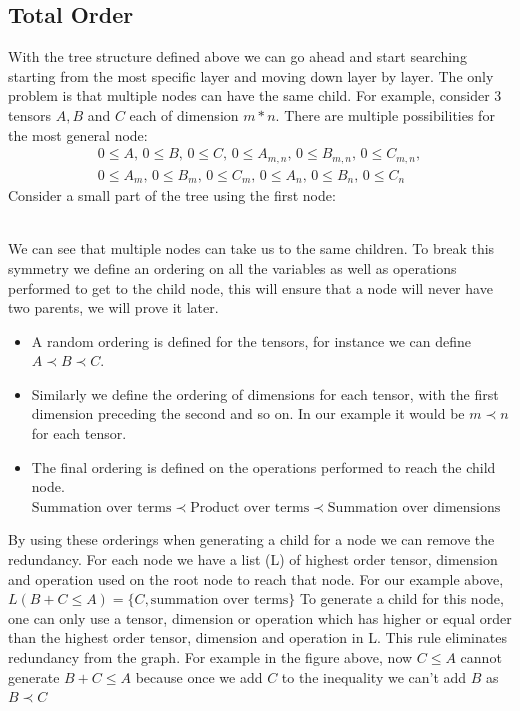 \documentclass{article}
\begin{document}
\subsection{Total Order}
With the tree structure defined above we can go ahead and start searching starting from the most specific layer and moving down layer by layer. The only problem is that multiple nodes can have the same child. 
For example, consider 3 tensors $A, B$ and $C$ each of dimension $m*n$. There are multiple possibilities for the most general node:
\begin{multline*}
    0 \le A,\, 0 \le B,\, 0\le C,\, 
    0 \le A_{m,n},\, 0 \le B_{m,n},\, 0\le C_{m,n},\\
    0 \le A_m,\, 0 \le B_m,\, 0\le C_m,\,
    0 \le A_n,\, 0 \le B_n,\, 0\le C_n
\end{multline*}
Consider a small part of the tree using the first node:
\\
We can see that multiple nodes can take us to the same children. To break this symmetry we define an ordering on all the variables as well as operations performed to get to the child node, this will ensure that a node will never have two parents, we will prove it later.
\begin{itemize}
    \item A random ordering is defined for the tensors, for instance we can define $A \prec B \prec C$.
    \item Similarly we define the ordering of dimensions for each tensor, with the first dimension preceding the second and so on. In our example it would be $m \prec n$ for each tensor.
    \item The final ordering is defined on the operations performed to reach the child node. $\text{Summation over terms} \prec \text{Product over terms} \prec \text{Summation over dimensions}$
\end{itemize}
By using these orderings when generating a child for a node we can remove the redundancy. 
For each node we have a list (L) of highest order tensor, dimension and operation used on the root node to reach that node. For our example above, $L(B+C \le A)=\{C,\text{summation over terms}\}$
To generate a child for this node, one can only use a tensor, dimension or operation which has higher or equal order than the highest order tensor, dimension and operation in L.
This rule eliminates redundancy from the graph. For example in the figure above, now $C\le A$ cannot generate $B+C\le A$ because once we add $C$ to the inequality we can't add $B$ as $B \prec C$
\end{document}
